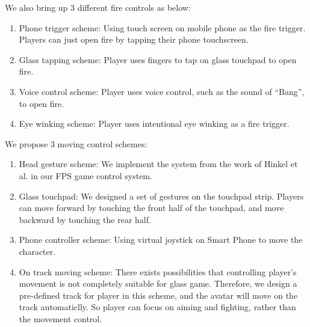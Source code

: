 \documentclass{sig-alternate}
\begin{document}
We also bring up 3 different fire controls as below:

\begin{enumerate}
\item Phone trigger scheme: Using touch screen on mobile phone as the fire trigger. Players can just open fire by tapping their phone touchscreen.

\item Glass tapping scheme: Player uses fingers to tap on glass touchpad to open fire.

\item Voice control scheme: Player uses voice control, such as the sound of ``Bang'', to open fire.

\item Eye winking scheme: Player uses intentional eye winking as a fire trigger.
\end{enumerate}

We propose 3 moving control schemes:

\begin{enumerate}
\item Head gesture scheme: We implement the system from the work of Hinkel et al.\cite{wheel} in our FPS game control system.

\item Glass touchpad: We designed a set of gestures on the touchpad strip. Players can move forward by touching the front half of the touchpad, and move backward by touching the rear half.

\item Phone controller scheme: Using virtual joystick on Smart Phone to move the character.

\item On track moving scheme: There exists possibilities that controlling player's movement is not completely suitable for glass game. Therefore, we design a pre-defined track for player in this scheme, and the avatar will move on the track automaticlly. So player can focus on aiming and fighting, rather than the movement control.
\end{enumerate}
\end{document}
